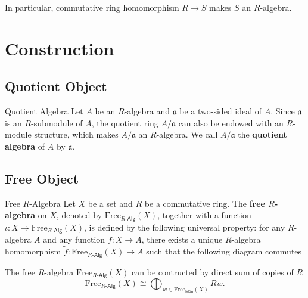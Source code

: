 In particular, commutative ring homomorphism $R\to S$ makes $S$ an $R$-algebra.



\section{Construction}
\subsection{Quotient Object}

\begin{definition}{Quotient Algebra}{}
    Let $A$ be an $R$-algebra and $\mathfrak{a}$ be a two-sided ideal of $A$. Since $\mathfrak{a}$ is an $R$-submodule of $A$, the quotient ring $A/\mathfrak{a}$ can also be endowed with an $R$-module structure, which makes $A/\mathfrak{a}$ an $R$-algebra. We call $A/\mathfrak{a}$ the \textbf{quotient algebra} of $A$ by $\mathfrak{a}$.
\end{definition}


\subsection{Free Object}
\begin{definition}{Free $R$-Algebra}{}
    Let $X$ be a set and $R$ be a commutative ring. The \textbf{free $R$-algebra} on $X$, denoted by $\mathrm{Free}_{R\text{-}\mathsf{Alg}}(X)$, together with a function $\iota:X\to \mathrm{Free}_{R\text{-}\mathsf{Alg}}(X)$, is defined by the following universal property: for any $R$-algebra $A$ and any function $f:X\to A$, there exists a unique $R$-algebra homomorphism $\widetilde{f}:\mathrm{Free}_{R\text{-}\mathsf{Alg}}(X)\to A$ such that the following diagram commutes
    \begin{center}
    \end{center}
    The free $R$-algebra $\mathrm{Free}_{R\text{-}\mathsf{Alg}}(X)$ can be contructed by direct sum of copies of $R$
    \[
        \mathrm{Free}_{R\text{-}\mathsf{Alg}}(X)\cong\bigoplus_{w\in\mathrm{Free}_{\mathsf{Mon}}(X)}Rw.  
    \]
\end{definition}


